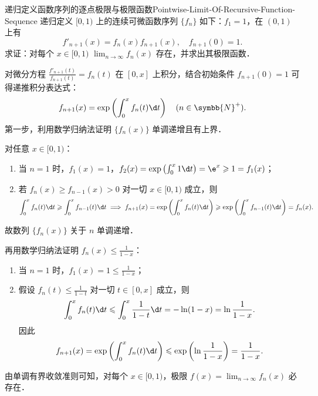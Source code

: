 \begin{problem}{递归定义函数序列的逐点极限与极限函数}{Pointwise-Limit-Of-Recursive-Function-Sequence}
    递归定义 $[0, 1)$ 上的连续可微函数序列 $\{f_n\}$ 如下：$f_1 = 1$，在 $(0, 1)$ 上有
    \begin{equation}
        f'_{n+1}(x) = f_n(x)f_{n+1}(x), \quad f_{n+1}(0) = 1.
    \end{equation}
    求证：对每个 $x \in [0, 1)$ $\lim_{n\to\infty} f_n(x)$ 存在，并求出其极限函数．
\end{problem}

\begin{solution}
    对微分方程 $\frac{f'_{n+1}(t)}{f_{n+1}(t)} = f_n(t)$ 在 $[0, x]$ 上积分，结合初始条件 $f_{n+1}(0) = 1$ 可得递推积分表达式：
    \begin{equation}
        f_{n+1}(x) = \exp\left( \int_0^x f_n(t)\d t \right) \quad (n \in \symbb{N}^+).
    \end{equation}
    第一步，利用数学归纳法证明 $\{f_n(x)\}$ 单调递增且有上界．

    对任意 $x \in [0, 1)$：
    \begin{enumerate}
        \item 当 $n = 1$ 时，$f_1(x) = 1$，$f_2(x) = \exp\left(\int_0^x 1\d t\right) = \e^x \geqslant 1 = f_1(x)$；
        \item 若 $f_n(x) \geqslant f_{n-1}(x) > 0$ 对一切 $x \in [0, 1)$ 成立，则
              \begin{equation}
                  \int_0^x f_n(t)\d t \geqslant \int_0^x f_{n-1}(t)\d t \implies f_{n+1}(x) = \exp\left( \int_0^x f_n(t)\d t \right) \geqslant \exp\left( \int_0^x f_{n-1}(t)\d t \right) = f_n(x).
              \end{equation}
    \end{enumerate}
    故数列 $\{f_n(x)\}$ 关于 $n$ 单调递增．

    再用数学归纳法证明 $f_n(x) \leqslant \frac{1}{1 - x}$：
    \begin{enumerate}
        \item 当 $n = 1$ 时，$f_1(x) = 1 \leqslant \frac{1}{1 - x}$；
        \item 假设 $f_n(t) \leqslant \frac{1}{1 - t}$ 对一切 $t \in [0, x]$ 成立，则
              \begin{equation}
                  \int_0^x f_n(t)\d t \leqslant \int_0^x \frac{1}{1 - t}\d t = -\ln(1 - x) = \ln\frac{1}{1 - x}.
              \end{equation}
              因此
              \begin{equation}
                  f_{n+1}(x) = \exp\left( \int_0^x f_n(t)\d t \right) \leqslant \exp\left( \ln\frac{1}{1 - x} \right) = \frac{1}{1 - x}.
              \end{equation}
    \end{enumerate}
    由单调有界收敛准则可知，对每个 $x \in [0, 1)$，极限 $f(x) = \lim_{n\to\infty} f_n(x)$ 必存在．


\end{solution}
